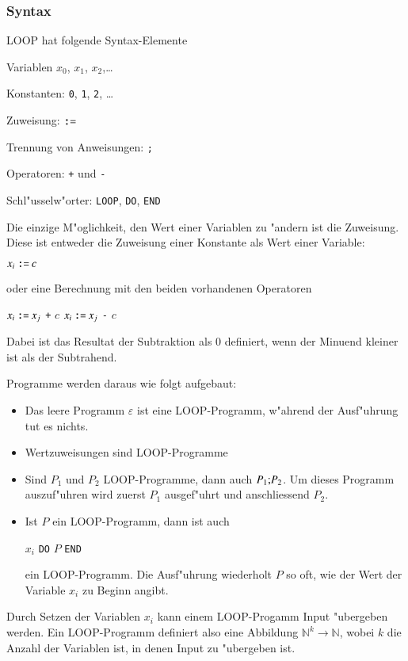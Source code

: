 \subsubsection{Syntax}
LOOP hat folgende Syntax-Elemente
\begin{compactitem}
\item Variablen $x_0$, $x_1$, $x_2$,\dots
\item Konstanten: {\tt 0}, {\tt 1}, {\tt 2}, \dots
\item Zuweisung: $\mathbin{\texttt{:=}}$
\item Trennung von Anweisungen: {\tt ;}
\item Operatoren: {\tt +} und {\tt -}
\item Schl"usselw"orter: {\tt LOOP}, {\tt DO}, {\tt END}
\end{compactitem}
Die einzige M"oglichkeit, den Wert einer Variablen zu "andern ist die
Zuweisung.  Diese ist entweder die Zuweisung einer Konstante als
Wert einer Variable:
\begin{algorithmic}
\STATE $x_i\mathbin{\texttt{:=}} c$
\end{algorithmic}
oder eine Berechnung mit den beiden vorhandenen Operatoren
\begin{algorithmic}
\STATE $x_i \mathbin{\texttt{:=}} x_j$ {\tt +} $c$
\STATE $x_i \mathbin{\texttt{:=}} x_j$ {\tt -} $c$
\end{algorithmic}
Dabei ist das Resultat der Subtraktion als $0$ definiert, wenn
der Minuend kleiner ist als der Subtrahend.

Programme werden daraus wie folgt aufgebaut:
\begin{itemize}
\item Das leere Programm $\varepsilon$ ist eine LOOP-Programm,
w"ahrend der Ausf"uhrung tut es nichts.
\item Wertzuweisungen sind LOOP-Programme
\item Sind $P_1$ und $P_2$ LOOP-Programme, dann auch
$P_1{\tt ;}P_2$. Um dieses Programm auszuf"uhren wird zuerst $P_1$
ausgef"uhrt und anschliessend $P_2$.
\item Ist $P$ ein LOOP-Programm, dann ist auch
\begin{algorithmic}
 $x_i$ {\tt DO} $P$ {\tt END}
\end{algorithmic}
ein LOOP-Programm. Die Ausf"uhrung wiederholt $P$ so oft, wie der
Wert der Variable $x_i$  zu Beginn angibt.
\end{itemize}
Durch Setzen der Variablen $x_i$ kann einem LOOP-Progamm Input "ubergeben
werden.
Ein LOOP-Programm definiert also eine Abbildung $\mathbb N^k\to\mathbb N$,
wobei $k$ die Anzahl der Variablen ist, in denen Input zu "ubergeben ist.

